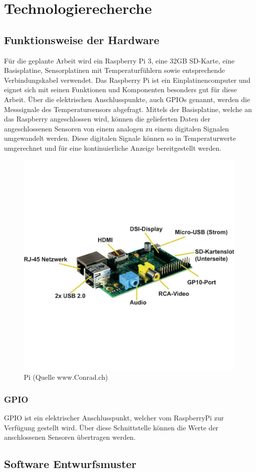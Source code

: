 \section{Technologierecherche}
\subsection{Funktionsweise der Hardware}
Für die geplante Arbeit wird ein Raspberry Pi 3, eine 32GB SD-Karte, eine Basisplatine, Sensorplatinen mit Temperaturfühlern sowie entsprechende Verbindungskabel verwendet. Das Raspberry Pi ist ein Einplatinencomputer und eignet sich mit seinen Funktionen und Komponenten besonders gut für diese Arbeit. Über die elektrischen Anschlusspunkte, auch GPIOs genannt, werden die Messsignale des Temperatursensors abgefragt. Mittels der Basisplatine, welche an das Raspberry angeschlossen wird, können die gelieferten Daten der angeschlossenen Sensoren von einem analogen zu einem digitalen Signalen umgewandelt werden.
Diese digitalen Signale können so in Temperaturwerte umgerechnet und für eine kontinuierliche Anzeige bereitgestellt werden.

\begin{figure}[H]%
\centering
\includegraphics[width=1\textwidth]{Images/RaspberryPi.jpg}
\caption{Pi (Quelle www.Conrad.ch)}
\label{fig:raspi}
\end{figure}

\subsubsection{GPIO}
GPIO ist ein elektrischer Anschlusspunkt, welcher vom RaspberryPi zur Verfügung gestellt wird. Über diese Schnittstelle können die Werte der anschlossenen Sensoren übertragen werden.

\subsection{Software Entwurfsmuster}
